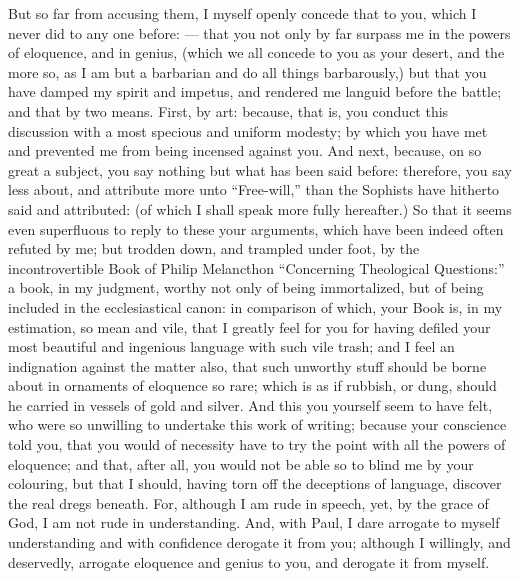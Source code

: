 But so far from accusing them, I myself openly concede that to you, which I never did to any one before: — that you not only by far surpass me in the powers of eloquence, and in genius, (which we all concede to you as your desert, and the more so, as I am but a barbarian and do all things barbarously,) but that you have damped my spirit and impetus, and rendered me languid before the battle; and that by two means. First, by art: because, that is, you conduct this discussion with a most specious and uniform modesty; by which you have met and prevented me from being incensed against you. And next, because, on so great a subject, you say nothing but what has been said before: therefore, you say less about, and attribute more unto “Free-will,” than the Sophists have hitherto said and attributed: (of which I shall speak more fully hereafter.) So that it seems even superfluous to reply to these your arguments, which have been indeed often refuted by me; but trodden down, and trampled under foot, by the incontrovertible Book of Philip Melancthon “Concerning Theological Questions:” a book, in my judgment, worthy not only of being immortalized, but of being included in the ecclesiastical canon: in comparison of which, your Book is, in my estimation, so mean and vile, that I greatly feel for you for having defiled your most beautiful and ingenious language with such vile trash; and I feel an indignation against the matter also, that such unworthy stuff should be borne about in ornaments of eloquence so rare; which is as if rubbish, or dung, should he carried in vessels of gold and silver. And this you yourself seem to have felt, who were so unwilling to undertake this work of writing; because your conscience told you, that you would of necessity have to try the point with all the powers of eloquence; and that, after all, you would not be able so to blind me by your colouring, but that I should, having torn off the deceptions of language, discover the real dregs beneath. For, although I am rude in speech, yet, by the grace of God, I am not rude in understanding. And, with Paul, I dare arrogate to myself understanding and with confidence derogate it from you; although I willingly, and deservedly, arrogate eloquence and genius to you, and derogate it from myself.

